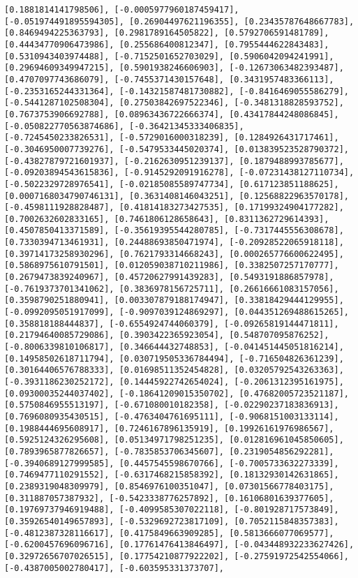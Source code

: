 \documentclass[11pt]{article}
\begin{document}
\begin{Verbatim}[commandchars=\\\{\}]
[0.1881814141798506], [-0.0005977960187459417], [-0.051974491895594305], [0.26904497621196355], [0.23435787648667783], [0.8469494225363793], [0.2981789164505822], [0.5792706591481789], [0.44434770906473986], [0.255686400812347], [0.7955444622843483], [0.5310943403974488], [-0.7152501652703029], [0.5906042094241991], [0.29694609349947215], [0.5901938246606903], [-0.12673063482393487], [0.4707097743686079], [-0.7455371430157648], [0.3431957483366113], [-0.2353165244331364], [-0.14321587481730882], [-0.8416469055586279], [-0.5441287102508304], [0.27503842697522346], [-0.3481318828593752], [0.7673753906692788], [0.08963436722666374], [0.43417844248086845], [-0.050822770563874686], [-0.36421345333406835], [-0.7245450233826531], [-0.5729016000318239], [0.1284926431717461], [-0.3046950007739276], [-0.5479533445020374], [0.013839523528790372], [-0.43827879721601937], [-0.2162630951239137], [0.1879488993785677], [-0.09203894543615836], [-0.9145292091916278], [-0.07231438127110734], [-0.5022329728976541], [-0.02185085589747734], [0.617123851188625], [0.0007168034790746131], [0.3631408146043251], [0.12568822963570178], [-0.4598111928828487], [0.41814183273427535], [0.17199324904177282], [0.7002632602833165], [0.7461806128658643], [0.8311362729614393], [0.4507850413371589], [-0.35619395544280785], [-0.7317445556308678], [0.7330394713461931], [0.24488693850471974], [-0.20928522065918118], [0.39714173258930296], [0.7621793314668243], [0.000265776600622495], [0.5868975610791501], [0.012059038710211986], [0.3382507257170777], [0.2679473839240967], [0.45720627991439283], [0.5493191886857978], [-0.7619373701341062], [0.3836978156725711], [0.26616661083157056], [0.3598790251880941], [0.003307879188174947], [0.33818429444129955], [-0.0992095051917099], [-0.9097039124869297], [0.044351269488615265], [0.358818188444837], [-0.6554924744060379], [-0.09265819144471811], [0.21794640085729086], [0.3903422365923054], [0.548707095876252], [-0.8006339810106817], [0.346644432748853], [-0.041451445051816214], [0.14958502618711794], [0.030719505336784494], [-0.716504826361239], [0.30164406576788333], [0.01698511352454828], [0.03205792543263363], [-0.3931186230252172], [0.14445922742654024], [-0.2061312395161975], [0.09300035244037402], [-0.18641209015350702], [0.47682005723521187], [0.5750846955513197], [-0.671080010182358], [-0.02290237183836913], [0.7696080935430515], [-0.4763404761695111], [-0.9068151003133114], [0.1988444695608917], [0.7246167896135919], [0.19926161976986567], [0.5925124326295608], [0.05134971798251235], [0.012816961045850605], [0.7893965877826657], [-0.7835853706345607], [0.2319054856292281], [-0.3940689127999585], [0.4457545598670766], [-0.7005733632273339], [0.7469477110291552], [-0.6317468215858392], [0.18132930142631865], [0.2389319048309979], [0.8546976100351047], [0.07301566778403175], [0.311887057387932], [-0.5423338776257892], [0.16106801639377605], [0.19769737946919488], [-0.4099585307022118], [-0.801928717573849], [0.35926540149657893], [-0.5329692723817109], [0.7052115848357383], [-0.4812387328116617], [0.4175849663909285], [0.5813666077069577], [-0.6200457696096716], [0.17761476413846497], [-0.043448932233627426], [0.32972656707026515], [0.17754210877922202], [-0.27591972542554066], [-0.4387005002780417], [-0.603595331373707], 
\end{Verbatim}
\end{document}
